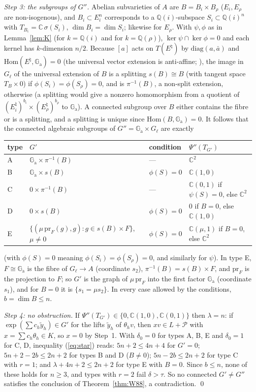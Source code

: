 \documentclass[11pt]{amsart}
\theoremstyle{definition}
\newcommand{\C}{\mathbb{C}}
\newcommand{\Q}{\mathbb{Q}}
\newcommand{\Ga}{\mathbb{G}_{\mathrm a}}
\begin{document}
\emph{Step 3: the subgroups of $G''$.} Abelian subvarieties of $A$ are $B=B_i\times B_\rho$ ($E_i,E_\rho$ are
non-isogenous), and $B_i\subset E_i^n$ corresponds to a $\Q(i)$-subspace $S_i\subset\Q(i)^n$ with $T_{B_i}=\C\,\sigma(S_i)$,
$\dim B_i=\dim S_i$; likewise for $E_\rho$. With $\psi,\phi$ as in Lemma~\ref{lem:K} (for $k=\Q(i)$ and for $k=\Q(\rho)$), $\ker\psi\cap\ker\phi=0$ and each
kernel has $k$-dimension $n/2$. Because $[a]$ acts on $T(E^\natural)$ by $\mathrm{diag}(a,\bar a)$ and $\mathrm{Hom}(E^\natural,\Ga)=0$ (the universal vector extension is anti-affine; \cite{MM74}),
the image in $G_\ell$ of the universal extension of $B$ is a splitting $s(B)\cong B$ (with tangent space
$T_B\times0$) if $\phi(S_i)=\phi(S_\rho)=0$, and is $\pi^{-1}(B)$, a non-split extension, otherwise (a splitting would give a nonzero homomorphism from a quotient of $(E_i^\natural)^{b_i}\times(E_\rho^\natural)^{b_\rho}$ to $\Ga$). A connected subgroup over $B$ either contains the fibre or is a splitting, and a splitting is unique since $\mathrm{Hom}(B,\Ga)=0$. It follows that the
connected algebraic subgroups of $G''=\Ga\times G_\ell$ are exactly
\begin{center}
\begin{tabular}{llll}
type & $G'$ & condition & $\Psi''(T_{G'})$\\\hline
A & $\Ga\times\pi^{-1}(B)$ & --- & $\C^2$\\
B & $\Ga\times s(B)$ & $\phi(S)=0$ & $\C(1,0)$\\
C & $0\times\pi^{-1}(B)$ & --- & $\C(0,1)$ if $\psi(S)=0$, else $\C^2$\\
D & $0\times s(B)$ & $\phi(S)=0$ & $0$ if $B=0$, else $\C(1,0)$\\
E & $\{(\mu\,\mathrm{pr}_F(g),g):g\in s(B)\times F\}$, $\mu\ne0$ & $\phi(S)=0$ & $\C(\mu,1)$ if $B=0$, else $\C^2$
\end{tabular}
\end{center}
(with $\phi(S)=0$ meaning $\phi(S_i)=\phi(S_\rho)=0$, and similarly for $\psi$). In type E, $F\cong\Ga$ is the fibre of
$G_\ell\to A$ (coordinate $s_2$), $\pi^{-1}(B)=s(B)\times F$, and $\mathrm{pr}_F$ is the projection to $F$; so $G'$ is the
graph of $\mu\,\mathrm{pr}_F$ into the first factor $\Ga$ (coordinate $s_1$), and for $B=0$ it is $\{s_1=\mu s_2\}$. In every case allowed by the conditions,
$b=\dim B\le n$.

\emph{Step 4: no obstruction.} If $\Psi''(T_{G'})\in\{0,\C(1,0),\C(0,1)\}$ then $\lambda=n$: if
$\exp(\sum c_h\tilde y_h)\in G'$ for the lifts $\tilde y_h$ of $\theta_hv$, then $xv\in L+\mathcal P$ with $x=\sum c_h\theta_h\in K$, so
$x=0$ by Step~1. With $\delta_0=0$ for types A, B, E and $\delta_0=1$ for C, D, inequality (\ref{eq:star}) reads:
$5n+2\le4n+4$ for $G'=0$; $5n+2-2b\le2n+2$ for types B and D ($B\neq0$); $5n-2b\le2n+2$ for type C with $r=1$; and
$\lambda+4n+2\le2n+2$ for type E with $B=0$. Since $b\le n$, none of these holds for $n\ge3$, and types with $r=2$ fail
$\delta>\tau$. So no connected $G'\ne G''$ satisfies the conclusion of Theorem~\ref{thm:W88}, a contradiction. \qed
\end{document}
